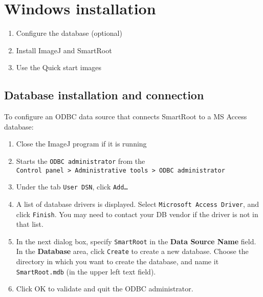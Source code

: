 
\newpage
{\color{coolSection}\section{Windows installation}}

\begin{enumerate}
\item Configure the database (optional)
\item Install ImageJ and SmartRoot
\item Use the Quick start images
\end{enumerate}

%
%

{\color{coolSubSection}\subsection{Database installation and connection}}
\label{dbwin}

\noindent To configure an ODBC data source that connects SmartRoot to a MS Access database:\\

\begin{enumerate}
\item Close the ImageJ program if it is running
\item Starts the \verb|ODBC administrator| from the \\ \verb|Control panel > Administrative tools > ODBC administrator|
\item Under the tab \verb|User DSN|, click \verb|Add…|
\item A list of database drivers is displayed. Select \verb|Microsoft Access Driver|, and click \verb|Finish|. You may need to contact your DB vendor if the driver is not in that list.
\item In the next dialog box, specify \verb|SmartRoot| in the \textbf{Data Source Name} field. In the \textbf{Database} area, click \verb|Create| to create a new database. Choose the directory in which you want to create the database, and name it \verb|SmartRoot.mdb| (in the upper left text field).
\item Click OK to validate and quit the ODBC administrator.\\
\end{enumerate}

